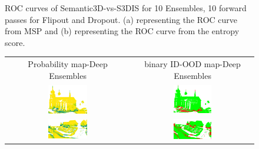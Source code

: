 \begin{figure}[h!]
\begin{subfigure}{0.495\textwidth}
            \caption{}
            \label{fig:roc_ent_10_ood_1}
        \end{subfigure}
        \caption{ROC curves of Semantic3D-vs-S3DIS for 10 Ensembles, 10 forward passes for Flipout and Dropout. (a) representing the ROC curve from MSP and (b) representing the ROC curve from the entropy score.}
    \end{figure}
    
    \begin{figure}[h!]
        \centering
        \begin{tabular}{cc}
            Probability map-Deep Ensembles & binary ID-OOD map-Deep Ensembles \\
            \includegraphics[width=0.33\textwidth, height=0.18\textheight]{images/ood_imgs/de_sem3d/de_prob_10_1.pdf}& 
            \includegraphics[width=0.33\textwidth, height=0.18\textheight]{images/ood_imgs/de_sem3d/de_ood_auroc_1.pdf}\\

            \includegraphics[width=0.33\textwidth, height=0.18\textheight]{images/ood_imgs/de_sem3d/de_prob_10_2.pdf}& 
            \includegraphics[width=0.33\textwidth, height=0.18\textheight]{images/ood_imgs/de_sem3d/de_ood_auroc_2.pdf}\\


\end{tabular}
\end{figure}
